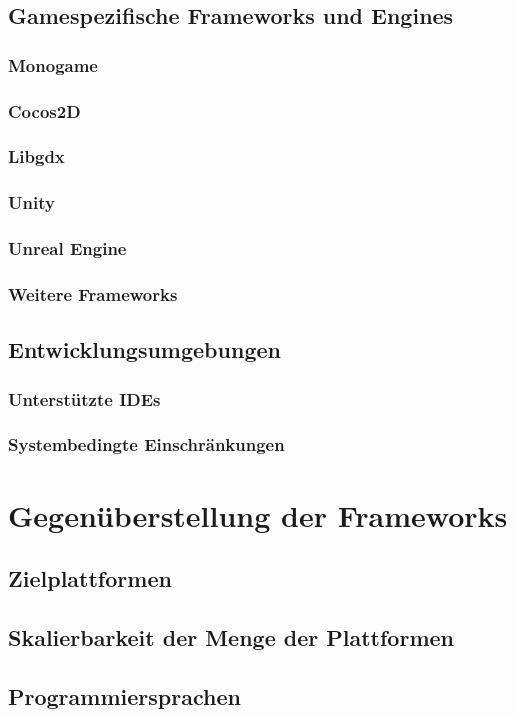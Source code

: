 \section{Gamespezifische Frameworks und Engines}
\subsection{Monogame}
\subsection{Cocos2D}
\subsection{Libgdx}
\subsection{Unity}
\subsection{Unreal Engine}
\subsection{Weitere Frameworks}
\section{Entwicklungsumgebungen}
\subsection{Unterstützte IDEs}
\subsection{Systembedingte Einschränkungen}

\chapter{Gegenüberstellung der Frameworks}
\section{Zielplattformen}
\section{Skalierbarkeit der Menge der Plattformen} %
\section{Programmiersprachen}
